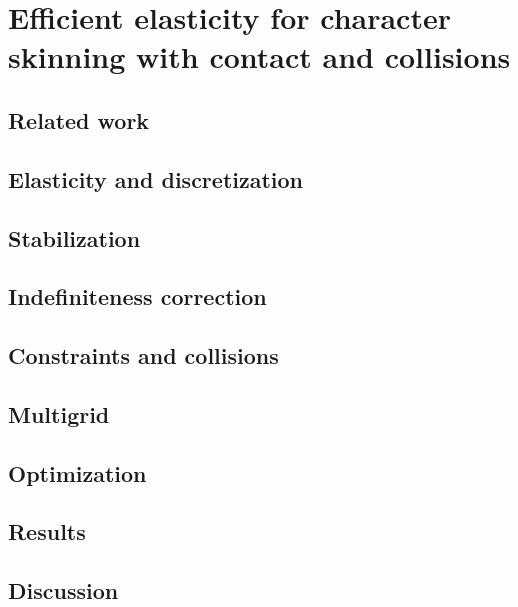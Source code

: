 \chapter{Efficient elasticity for character skinning with contact and collisions}\label{chap:elasticity}


\section{Related work}
\label{sec:relatedwork}


\section{Elasticity and discretization}
\label{sec:elasticity}


\section{Stabilization}
\label{sec:stabilization}


\section{Indefiniteness correction}
\label{sec:indefiniteness}


\section{Constraints and collisions}
\label{sec:constraints}


\section{Multigrid}
\label{sec:multigrid}


\section{Optimization}
\label{sec:implementation}


\section{Results}
\label{sec:results}


\section{Discussion}
\label{sec:discussion}

